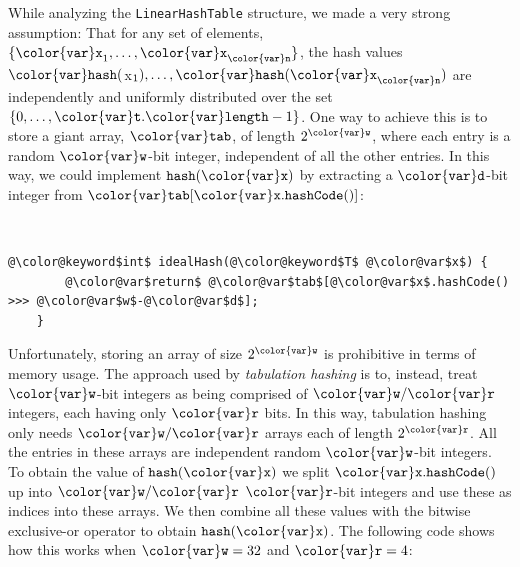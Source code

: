 \documentclass[10pt]{book}
\theoremstyle{plain}
\theoremstyle{definition}
\begin{document}
%
While analyzing the \texttt{LinearHashTable} structure, we made a very strong
assumption:  That for any set of elements, $\{\ensuremath{\mathtt{{\color{var}x}}}_1,\ldots,\ensuremath{\mathtt{{\color{var}x}}}_\ensuremath{\mathtt{{\color{var}n}}}\}$,
the hash values $\ensuremath{\mathtt{{\color{var}hash}}}($x$_1),\ldots,\ensuremath{\mathtt{{\color{var}hash}}}(\ensuremath{\mathtt{{\color{var}x}}}_\ensuremath{\mathtt{{\color{var}n}}})$ are independently and
uniformly distributed over the set $\{0,\ldots,\ensuremath{\mathtt{{\color{var}t}.{\color{var}length}}}-1\}$.  One way to
achieve this is to store a giant array, \ensuremath{\mathtt{{\color{var}tab}}}, of length $2^{\ensuremath{\mathtt{{\color{var}w}}}}$,
where each entry is a random \ensuremath{\mathtt{{\color{var}w}}}-bit integer, independent of all the
other entries.  In this way, we could implement \ensuremath{\mathtt{hash({\color{var}x})}} by extracting
a \ensuremath{\mathtt{{\color{var}d}}}-bit integer from \ensuremath{\mathtt{{\color{var}tab}[{\color{var}x}.hashCode()]}}:


 \ \vspace{.5ex}\begin{Verbatim}[gobble=1,tabsize=2,frame=single,framerule=1.2pt,commandchars=\\@\$,label=\texttt{LinearHashTable},labelposition=topline]
	@\color@keyword$int$ idealHash(@\color@keyword$T$ @\color@var$x$) {
		@\color@var$return$ @\color@var$tab$[@\color@var$x$.hashCode() >>> @\color@var$w$-@\color@var$d$];
	}
\end{Verbatim}


Unfortunately, storing an array of size $2^{\ensuremath{\mathtt{{\color{var}w}}}}$ is prohibitive in terms
of memory usage.  The approach used by \emph{tabulation hashing} is to,
instead, treat \ensuremath{\mathtt{{\color{var}w}}}-bit integers as being comprised of $\ensuremath{\mathtt{{\color{var}w}}}/\ensuremath{\mathtt{{\color{var}r}}}$
integers, each having only $\ensuremath{\mathtt{{\color{var}r}}}$ bits.  In this way, tabulation hashing
only needs $\ensuremath{\mathtt{{\color{var}w}}}/\ensuremath{\mathtt{{\color{var}r}}}$ arrays each of length $2^{\ensuremath{\mathtt{{\color{var}r}}}}$.  All the entries
in these arrays are independent random \ensuremath{\mathtt{{\color{var}w}}}-bit integers.  To obtain the value
of \ensuremath{\mathtt{hash({\color{var}x})}} we split \ensuremath{\mathtt{{\color{var}x}.hashCode()}} up into $\ensuremath{\mathtt{{\color{var}w}}}/\ensuremath{\mathtt{{\color{var}r}}}$ \ensuremath{\mathtt{{\color{var}r}}}-bit integers
and use these as indices into these arrays.  We then combine all these
values with the bitwise exclusive-or operator to obtain \ensuremath{\mathtt{hash({\color{var}x})}}.
The following code shows how this works when $\ensuremath{\mathtt{{\color{var}w}}}=32$ and $\ensuremath{\mathtt{{\color{var}r}}}=4$:
\end{document}
